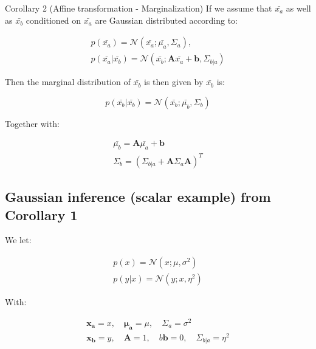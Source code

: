 \begin{wbox}{Corollary 2 (Affine transformation - Marginalization)}
    If we assume that $\bar{x_a}$ as well as $\bar{x_b}$ conditioned on $\bar{x_a}$ are Gaussian distributed according to:

    \begin{equation}
    \begin{aligned}
        p(\bar{x_a}) = \mathcal{N}(\bar{x_a}; \bar{\mu_a}, \Sigma_a), \\
        p(\bar{x_a}|\bar{x_b}) = \mathcal{N}(\bar{x_b}; \textbf{A}\bar{x_a} + \textbf{b}, \Sigma_{b|a} )  
    \end{aligned}
    \end{equation}

    Then the marginal distribution of $\bar{x_b}$ is  then given by $\bar{x_b}$  is:

    \begin{equation}    
        p(\bar{x_b}|\bar{x_b}) = \mathcal{N}(\bar{x_b}; \bar{\mu_{b}}, \Sigma_{b})
    \end{equation}

    Together with:

    \begin{equation}
    \begin{aligned}
        \bar{{\mu_{b}}} = \textbf{A}\bar{\mu_a} + \textbf{b} \\
        \Sigma_{b} = (\Sigma_{b|a} + \textbf{A} \Sigma_{a}\textbf{A})^{T} 
    \end{aligned}
    \end{equation}
\end{wbox}


\subsection*{Gaussian inference (scalar example) from Corollary 1}
We let:

\begin{equation}
\begin{aligned}
    p(x) = \mathcal{N}(x;\mu,\sigma^{2}) \\
    p(y|x) = \mathcal{N}(y; x, \eta^{2})
\end{aligned}
\end{equation}

With:

\begin{equation}
\begin{aligned}
    \bm{x_a} = x, \quad \bm{\mu_a} = \mu, \quad \Sigma_a = \sigma^{2} \\
    \bm{x_b} = y, \quad \textbf{A} = 1, \quad b \textbf{b} = 0, \quad \Sigma_{b|a} = \eta^{2}
\end{aligned}
\end{equation}

